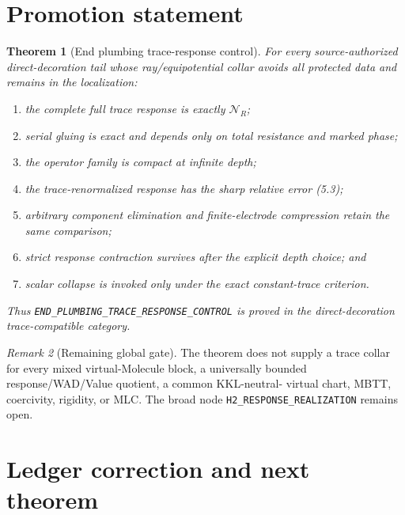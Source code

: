 \documentclass[10pt]{article}
\newtheorem{theorem}{Theorem}[section]
\theoremstyle{definition}
\theoremstyle{remark}
\newtheorem{remark}[theorem]{Remark}
\begin{document}
\section{Promotion statement}

\begin{theorem}[End plumbing trace-response control]
For every source-authorized direct-decoration tail whose ray/equipotential
collar avoids all protected data and remains in the localization:
\begin{enumerate}
 \item the complete full trace response is exactly $\mathcal N_R$;
 \item serial gluing is exact and depends only on total resistance and marked
 phase;
 \item the operator family is compact at infinite depth;
 \item the trace-renormalized response has the sharp relative error (5.3);
 \item arbitrary component elimination and finite-electrode compression retain
 the same comparison;
 \item strict response contraction survives after the explicit depth choice;
 and
 \item scalar collapse is invoked only under the exact constant-trace
 criterion.
\end{enumerate}
Thus \texttt{END\_PLUMBING\_TRACE\_RESPONSE\_CONTROL} is proved in the
direct-decoration trace-compatible category.
\end{theorem}

\begin{remark}[Remaining global gate]
The theorem does not supply a trace collar for every mixed virtual-Molecule
block, a universally bounded response/WAD/Value quotient, a common KKL-neutral-
virtual chart, MBTT, coercivity, rigidity, or MLC. The broad node
\texttt{H2\_RESPONSE\_REALIZATION} remains open.
\end{remark}

\section{Ledger correction and next theorem}
\enlargethispage{8\baselineskip}
\end{document}

